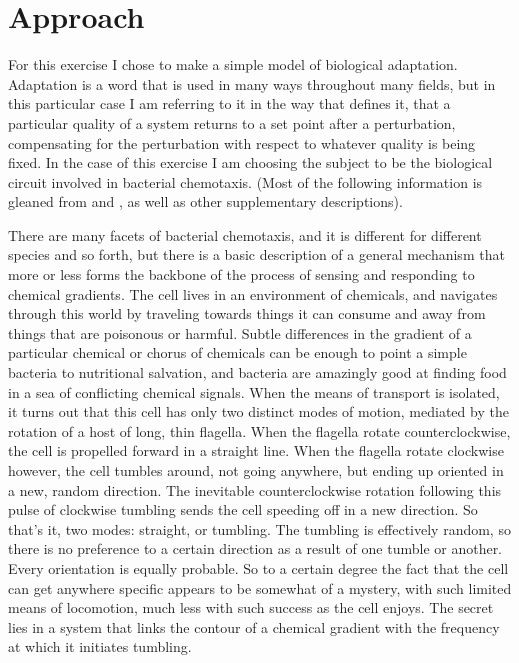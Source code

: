 \documentclass[12pt]{article}
\begin{document}
\maketitle

\section{Approach}

For this exercise I chose to make a simple model of biological adaptation.  Adaptation is a word that is used in many ways throughout many fields, but in this particular case I am referring to it in the way that \cite{Alon} defines it, that a particular quality of a system returns to a set point after a perturbation, compensating for the perturbation with respect to whatever quality is being fixed.  In the case of this exercise I am choosing the subject to be the biological circuit involved in bacterial chemotaxis.   (Most of the following information is gleaned from \cite{Alon} and \cite{Fall}, as well as other supplementary descriptions).  

There are many facets of bacterial chemotaxis, and it is different for different species and so forth, but there is a basic description of a general mechanism that more or less forms the backbone of the process of sensing and responding to chemical gradients.  The cell lives in an environment of chemicals, and navigates through this world by traveling towards things it can consume and away from things that are poisonous or harmful.  Subtle differences in the gradient of a particular chemical or chorus of chemicals can be enough to point a simple bacteria to nutritional salvation, and bacteria are amazingly good at finding food in a sea of conflicting chemical signals.  When the means of transport is isolated, it turns out that this cell has only two distinct modes of motion, mediated by the rotation of a host of long, thin flagella.  When the flagella rotate counterclockwise, the cell is propelled forward in a straight line.  When the flagella rotate clockwise however, the cell tumbles around, not going anywhere, but ending up oriented in a new, random direction.  The inevitable counterclockwise rotation following this pulse of clockwise tumbling sends the cell speeding off in a new direction.  So that's it, two modes: straight, or tumbling.  The tumbling is effectively random, so there is no preference to a certain direction as a result of one tumble or another.  Every orientation is equally probable.  So to a certain degree the fact that the cell can get anywhere specific appears to be somewhat of a mystery, with such limited means of locomotion, much less with such success as the cell enjoys.  The secret lies in a system that links the contour of a chemical gradient with the frequency at which it initiates tumbling.  
\end{document}
